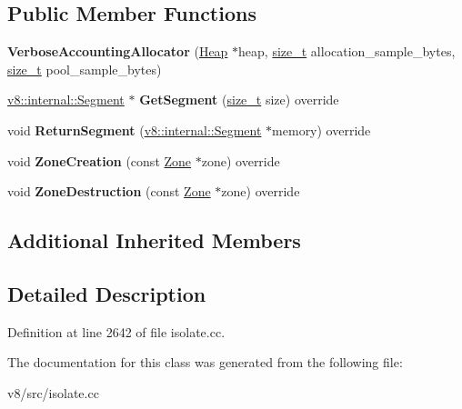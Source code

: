 \subsection*{Public Member Functions}
\begin{DoxyCompactItemize}
\item 
\mbox{\label{classv8_1_1internal_1_1VerboseAccountingAllocator_a0742bad5e20eb6ee6b2b5a4d71e91fa6}} 
{\bfseries Verbose\+Accounting\+Allocator} (\mbox{\hyperlink{classv8_1_1internal_1_1Heap}{Heap}} $\ast$heap, \mbox{\hyperlink{classsize__t}{size\+\_\+t}} allocation\+\_\+sample\+\_\+bytes, \mbox{\hyperlink{classsize__t}{size\+\_\+t}} pool\+\_\+sample\+\_\+bytes)
\item 
\mbox{\label{classv8_1_1internal_1_1VerboseAccountingAllocator_a10d75591d32967201b82417108b4aeb9}} 
\mbox{\hyperlink{classv8_1_1internal_1_1Segment}{v8\+::internal\+::\+Segment}} $\ast$ {\bfseries Get\+Segment} (\mbox{\hyperlink{classsize__t}{size\+\_\+t}} size) override
\item 
\mbox{\label{classv8_1_1internal_1_1VerboseAccountingAllocator_aa07106579818c6037b2e9101238d12e8}} 
void {\bfseries Return\+Segment} (\mbox{\hyperlink{classv8_1_1internal_1_1Segment}{v8\+::internal\+::\+Segment}} $\ast$memory) override
\item 
\mbox{\label{classv8_1_1internal_1_1VerboseAccountingAllocator_a156b7808945de5d8655498ff26ede16f}} 
void {\bfseries Zone\+Creation} (const \mbox{\hyperlink{classv8_1_1internal_1_1Zone}{Zone}} $\ast$zone) override
\item 
\mbox{\label{classv8_1_1internal_1_1VerboseAccountingAllocator_a31f2bfd320cbbdd75097b6c7e586ce80}} 
void {\bfseries Zone\+Destruction} (const \mbox{\hyperlink{classv8_1_1internal_1_1Zone}{Zone}} $\ast$zone) override
\end{DoxyCompactItemize}
\subsection*{Additional Inherited Members}


\subsection{Detailed Description}


Definition at line 2642 of file isolate.\+cc.



The documentation for this class was generated from the following file\+:\begin{DoxyCompactItemize}
\item 
v8/src/isolate.\+cc\end{DoxyCompactItemize}
